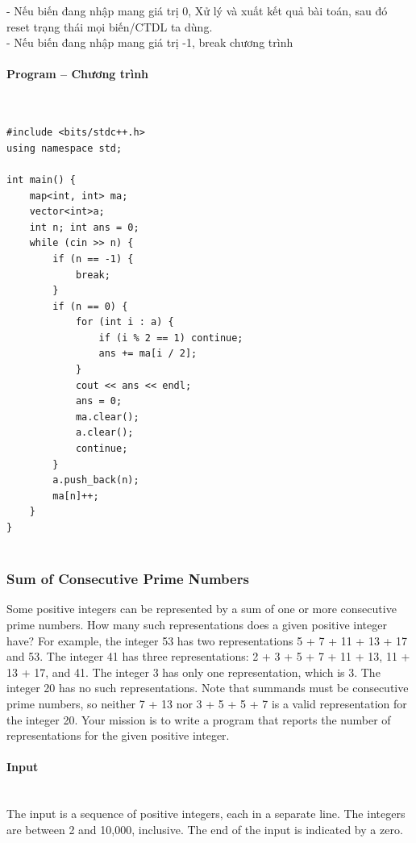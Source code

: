 \documentclass{article}
\begin{document}
- Nếu biến đang nhập mang giá trị 0, Xử lý và xuất kết quả bài toán, sau đó reset trạng thái mọi biến/CTDL ta dùng. \\
- Nếu biến đang nhập mang giá trị -1, break chương trình  

\paragraph{Program -- Chương trình} \mbox{} \\


\begin{lstlisting}
#include <bits/stdc++.h>
using namespace std;

int main() {	
	map<int, int> ma;
	vector<int>a;
	int n; int ans = 0;
	while (cin >> n) {
		if (n == -1) {
			break;
		}
		if (n == 0) {
			for (int i : a) {
				if (i % 2 == 1) continue;
				ans += ma[i / 2];
			}
			cout << ans << endl;
			ans = 0;
			ma.clear();
			a.clear();
			continue;
		}
		a.push_back(n);
		ma[n]++;
	}
}
	
\end{lstlisting}


\subsubsection{Sum of Consecutive Prime Numbers}

Some positive integers can be represented by a sum of one or more consecutive prime numbers.
How many such representations does a given positive integer have? For example, the integer 53
has two representations 5 + 7 + 11 + 13 + 17 and 53. The integer 41 has three representations:
2 + 3 + 5 + 7 + 11 + 13, 11 + 13 + 17, and 41. The integer 3 has only one representation, which is
3. The integer 20 has no such representations. Note that summands must be consecutive prime
numbers, so neither 7 + 13 nor 3 + 5 + 5 + 7 is a valid representation for the integer 20. Your
mission is to write a program that reports the number of representations for the given positive
integer.

\paragraph{Input} \mbox{} \\

The input is a sequence of positive integers, each in a separate line. The integers are between 2 and
10,000, inclusive. The end of the input is indicated by a zero.
\end{document}
